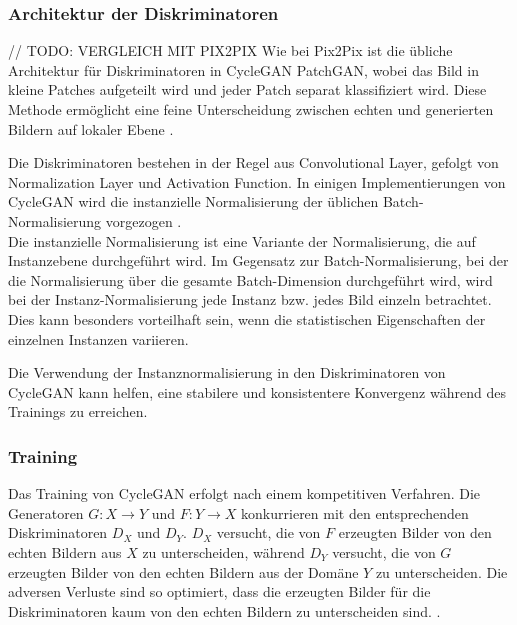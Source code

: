 \subsubsection{Architektur der Diskriminatoren}
// TODO: VERGLEICH MIT PIX2PIX
Wie bei Pix2Pix ist die übliche Architektur für Diskriminatoren in CycleGAN PatchGAN, wobei das Bild in kleine Patches aufgeteilt wird und jeder Patch separat klassifiziert wird. Diese Methode ermöglicht eine feine Unterscheidung zwischen echten und generierten Bildern auf lokaler Ebene \cite{Zhu.2017}.

Die Diskriminatoren bestehen in der Regel aus Convolutional Layer, gefolgt von Normalization Layer und Activation Function. In einigen Implementierungen von CycleGAN wird die instanzielle Normalisierung der üblichen Batch-Normalisierung vorgezogen \cite{}.
\\
Die instanzielle Normalisierung ist eine Variante der Normalisierung, die auf Instanzebene durchgeführt wird. Im Gegensatz zur Batch-Normalisierung, bei der die Normalisierung über die gesamte Batch-Dimension durchgeführt wird, wird bei der Instanz-Normalisierung jede Instanz bzw. jedes Bild einzeln betrachtet. Dies kann besonders vorteilhaft sein, wenn die statistischen Eigenschaften der einzelnen Instanzen variieren.

Die Verwendung der Instanznormalisierung in den Diskriminatoren von CycleGAN kann helfen, eine stabilere und konsistentere Konvergenz während des Trainings zu erreichen.

\subsubsection{Training}
Das Training von CycleGAN erfolgt nach einem kompetitiven Verfahren. Die Generatoren $G:X\rightarrow Y$ und $F:Y\rightarrow X$ konkurrieren mit den entsprechenden Diskriminatoren $D_X$ und $D_Y$. $D_X$ versucht, die von $F$ erzeugten Bilder von den echten Bildern aus $X$ zu unterscheiden, während $D_Y$ versucht, die von $G$ erzeugten Bilder von den echten Bildern aus der Domäne $Y$ zu unterscheiden. Die adversen Verluste sind so optimiert, dass die erzeugten Bilder für die Diskriminatoren kaum von den echten Bildern zu unterscheiden sind. \cite{Zhu.2017}.


